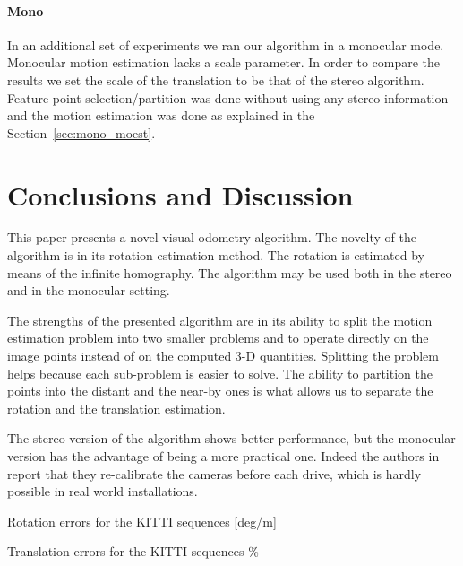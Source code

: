 \documentclass{bmvc2k}
\begin{document}
\paragraph{Mono} In an additional set of experiments we ran our
algorithm in a monocular mode. Monocular motion estimation lacks a
scale parameter. In order to compare the results we set the
scale of the translation to be that of the stereo algorithm.  Feature
point selection/partition was done without using any stereo
information and the motion estimation was done as explained in the
Section~\ref{sec:mono_moest}.

\section{Conclusions and Discussion}
This paper presents a novel visual odometry algorithm.  The novelty of
the algorithm is in its rotation estimation method.  The rotation is
estimated by means of the infinite homography.  The algorithm may be
used both in the stereo and in the monocular setting.

The strengths of the presented algorithm are in its ability to split
the motion estimation problem into two smaller problems and to operate
directly on the image points instead of on the computed 3-D
quantities.  Splitting the problem helps because each sub-problem is
easier to solve.  The ability to partition the points into the distant
and the near-by ones is what allows us to separate the rotation and
the translation estimation.  

The stereo version of the algorithm shows better performance, but the
monocular version has the advantage of being a more practical one.
Indeed the authors in~\cite{Geiger2012} report that they re-calibrate
the cameras before each drive, which is hardly possible in real world
installations.

\begin{table}
  \centering
  \caption{Rotation errors for the KITTI sequences [deg/m]}
  \label{table:rot_err}
  \smallskip\noindent
  \resizebox{\linewidth}{!}{%
    
  }
\end{table}

\begin{table}
  \centering
  \caption{Translation errors for the KITTI sequences \% }
  \label{table:trans_err}
  \smallskip\noindent
  \resizebox{\linewidth}{!}{%
    
  }
\end{table}

\clearpage

\end{document}
